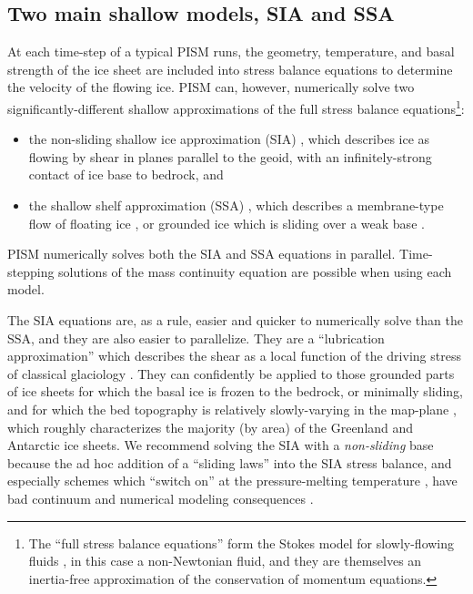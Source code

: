 \documentclass[11pt,final]{amsart}
\begin{document}
\subsection{Two main shallow models, SIA and SSA}  At each time-step of a typical PISM runs, the geometry, temperature, and basal strength of the ice sheet are included into stress balance equations to determine the velocity of the flowing ice.   PISM can, however, numerically solve two significantly-different shallow approximations of the full stress balance equations\footnote{The ``full stress balance equations'' form the Stokes model for slowly-flowing fluids \cite{Fowler}, in this case a non-Newtonian fluid, and they are themselves an inertia-free approximation of the conservation of momentum equations.}:\begin{itemize}
\item the non-sliding shallow ice approximation (SIA) \cite{Hutter}, which describes ice as flowing by shear in planes parallel to the geoid, with an infinitely-strong contact of ice base to bedrock, and
\item the shallow shelf approximation (SSA) \cite{WeisGreveHutter}, which describes a membrane-type flow of floating ice \cite{Morland}, or grounded ice which is sliding over a weak base \cite{MacAyeal,SchoofStream}.
\end{itemize}
PISM numerically solves both the SIA and SSA equations in parallel.  Time-stepping solutions of the mass continuity equation are possible when using each model.

The SIA equations are, as a rule, easier and quicker to numerically solve than the SSA, and they are also easier to parallelize.  They are a ``lubrication approximation'' \cite{Fowler} which describes the shear as a local function of the driving stress of classical glaciology \cite{Paterson}.  They can confidently be applied to those grounded parts of ice sheets for which the basal ice is frozen to the bedrock, or minimally sliding, and for which the bed topography is relatively slowly-varying in the map-plane \cite{Fowler}, which roughly characterizes the majority (by area) of the Greenland and Antarctic ice sheets.  We recommend solving the SIA with a \emph{non-sliding} base because the ad hoc addition of a ``sliding laws'' into the SIA stress balance, and especially schemes which ``switch on'' at the pressure-melting temperature \cite{EISMINT00}, have bad continuum and numerical modeling consequences \cite[appendix B]{BBssasliding}.
\end{document}
